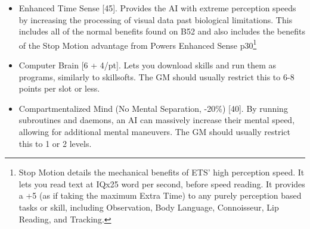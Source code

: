 \begin{multicols*}{3}
	\begin{itemize}
		\itemsep 0pt
		\item Enhanced Time Sense [45]. Provides the AI with extreme perception speeds by increasing the processing of visual data past biological limitations. This includes all of the normal benefits found on B52 and also includes the benefits of the Stop Motion advantage from \GURPS Powers Enhanced Sense p30\footnote{Stop Motion details the mechanical benefits of ETS' high perception speed. It lets you read text at IQx25 word per second, before speed reading. It provides a +5 (as if taking the maximum Extra Time) to any purely perception based tasks or skill, including Observation, Body Language, Connoisseur, Lip Reading, and Tracking.}
		\item Computer Brain [6 + 4/pt]. Lets you download skills and run them as programs, similarly to skillsofts. The GM should usually restrict this to 6-8 points per slot or less.
		\item Compartmentalized Mind (No Mental Separation, -20\%) [40]. By running subroutines and daemons, an AI can massively increase their mental speed, allowing for additional mental maneuvers. The GM should usually restrict this to 1 or 2 levels.
	\end{itemize}
	

\end{multicols*}
